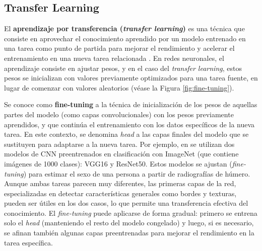 





\subsection{Transfer Learning}

El \textbf{aprendizaje por transferencia (\textit{transfer learning})} es una técnica que consiste en 
aprovechar el conocimiento aprendido por un modelo entrenado en una tarea como punto de partida para
mejorar el rendimiento y acelerar el entrenamiento en una nueva tarea relacionada \cite{rusell2021}.
En redes neuronales, el aprendizaje consiste en ajustar pesos, y en el caso del \textit{transfer learning}, 
estos pesos se inicializan con valores previamente optimizados para una tarea fuente, en lugar de comenzar con valores aleatorios (véase la Figura \ref{fig:fine-tuning}).

Se conoce como \textbf{fine-tuning} a la técnica de inicialización de los pesos de aquellas partes del modelo (como capas convolucionales) con los pesos previamente aprendidos, y que continúa el entrenamiento con los datos específicos de la nueva tarea. En este contexto, se denomina \textit{head} a las capas finales del modelo que se sustituyen para adaptarse a la nueva tarea. Por ejemplo, en \cite{venema2022} se utilizan dos modelos de \acrshort{CNN} preentrenados en clasificación con ImageNet (que contiene imágenes de 1000 clases): VGG16 y ResNet50. Estos modelos se ajustan (\textit{fine-tuning}) para estimar el sexo de una persona a partir de radiografías de húmero. Aunque ambas tareas parecen muy diferentes, las primeras capas de la red, especializadas en detectar características generales como bordes y texturas, pueden ser útiles en los dos casos, lo que permite una transferencia efectiva del conocimiento. El \textit{fine-tuning} puede aplicarse de forma gradual: primero se entrena solo el \textit{head} (manteniendo el resto del modelo congelado) y luego, si es necesario, se afinan también algunas capas  preentrenadas para mejorar el rendimiento en la tarea específica.

